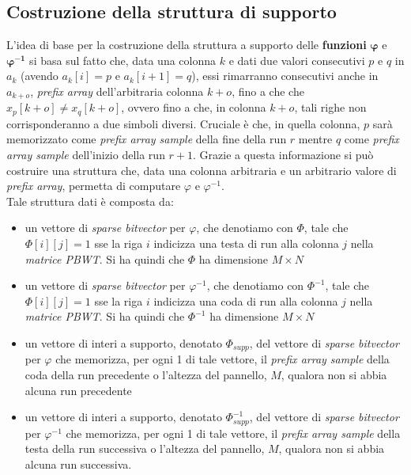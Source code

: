 \subsection{Costruzione della struttura di supporto}
L'idea di base per la costruzione della struttura a supporto delle
\textbf{funzioni} $\boldsymbol\varphi$ e $\boldsymbol\varphi\mathbf{^{-1}}$ si
basa sul fatto che, data una colonna $k$ e dati due valori consecutivi $p$ e $q$
in $a_k$ (avendo $a_k[i]=p$ e $a_k[i+1]=q$), essi rimarranno consecutivi anche
in $a_{k+o}$, \textit{prefix array} dell'arbitraria colonna $k+o$, fino a che
che $x_{p}[k+o]\neq x_{q}[k+o]$, ovvero fino a che, in colonna $k+o$, tali righe
non corrisponderanno a due simboli diversi. Cruciale è che, in quella colonna,
$p$ sarà memorizzato come \textit{prefix array sample} della fine della run $r$
mentre $q$ come \textit{prefix array sample} dell'inizio della run $r+1$. Grazie
a questa informazione si può costruire una struttura che, data una colonna
arbitraria e un arbitrario valore di \textit{prefix array}, permetta di
computare $\varphi$ e $\varphi^{-1}$.\\
Tale struttura dati è composta da:
\begin{itemize}
  \item un vettore di \textit{sparse bitvector} per $\varphi$, che denotiamo con
  $\varPhi$, tale che $\varPhi[i][j]=1$ sse la riga $i$ indicizza una testa di
  run alla colonna $j$ nella \textit{matrice PBWT}. Si ha quindi che $\varPhi$
  ha dimensione $M\times N$
  \item un vettore di \textit{sparse bitvector} per $\varphi^{-1}$, che
  denotiamo con $\varPhi^{-1}$, tale che $\varPhi[i][j]=1$ sse la riga $i$
  indicizza una coda di run alla colonna $j$ nella \textit{matrice PBWT}. Si ha
  quindi che $\varPhi^{-1}$ ha dimensione $M\times N$
  \item un vettore di interi a supporto, denotato $\varPhi_{supp}$, del vettore
  di \textit{sparse bitvector} 
  per $\varphi$ che memorizza, per ogni 1 di tale vettore, il
  \textit{prefix array sample} della coda della run precedente o l'altezza
  del pannello, $M$, qualora non si abbia alcuna run precedente
  \item un vettore di interi a supporto, denotato $\varPhi^{-1}_{supp}$, del
  vettore di \textit{sparse bitvector} 
  per $\varphi^{-1}$ che memorizza, per ogni 1 di tale vettore,
  il \textit{prefix array sample} della testa della run successiva o l'altezza
  del pannello, $M$, qualora non si abbia alcuna run successiva. 
\end{itemize}
